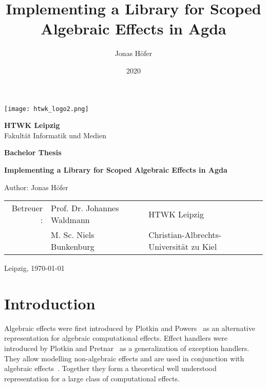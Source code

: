 \documentclass[10pt,a4paper,twoside,notitlepage]{report}
\title{Implementing a Library for Scoped Algebraic Effects in Agda}
\author{Jonas Höfer}
\date{2020}
\begin{document}
\begin{titlepage}
  \begin{large}
    \begin{center}

      \texttt{[image: htwk\_logo2.png]}

      \vskip 2cm

      \textbf{HTWK Leipzig}\\
      Fakultät Informatik und Medien\\

      \vskip 2cm

      \textbf{Bachelor Thesis}

      \vskip 2cm

    \textbf{Implementing a Library for Scoped Algebraic Effects in Agda}\\

      \vfill

      Author: Jonas Höfer\\

      \vskip 2cm

      \begin{tabular}{rll}
         Betreuer : & Prof. Dr. Johannes Waldmann & HTWK Leipzig\\
                    & M. Sc. Niels Bunkenburg     & Christian-Albrechts-Universität zu Kiel\\
      \end{tabular}

      \vskip 2cm

      Leipzig, \today\\

    \end{center}
  \end{large}
\end{titlepage}

\thispagestyle{plain}
\begin{abstract}
\end{abstract}
\begin{abstract}
\end{abstract}

\newpage

\tableofcontents

\chapter{Introduction}

Algebraic effects were first introduced by Plotkin and
Powers~\cite{DBLP:journals/acs/PlotkinP03} as an alternative representation for
algebraic computational effects.
Effect handlers were introduced by Plotkin and
Pretnar~\cite{DBLP:conf/esop/PlotkinP09} as a generalization of exception
handlers.
They allow modelling non-algebraic effects and are used in conjunction with
algebraic effects~\cite{DBLP:journals/corr/PlotkinP13}.
Together they form a theoretical well understood representation for a large
class of computational effects.
\end{document}
